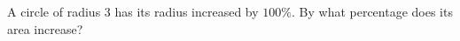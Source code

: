 A circle of radius $3$ has its radius increased by $100\%$. By what percentage does its area increase?
